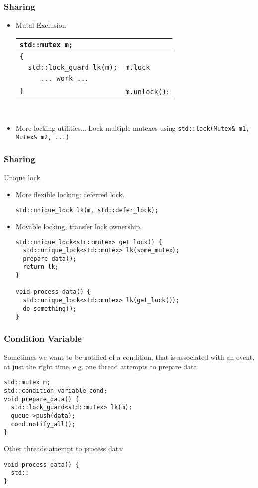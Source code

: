 \documentclass{beamer}
\begin{document}
\begin{frame}[fragile]
  \frametitle{Sharing}
  \begin{itemize}
  \item Mutal Exclusion
    \pause
    \begin{tabular}{l|l}
      \verb|std::mutex m;|&\\
      \hline
      \verb|{|&\\
      \hline
      \verb|  std::lock_guard lk(m);|&\verb|m.lock|\\
      \hline
      \verb|     ... work ...|&\\
      \hline
      \verb|}|&\verb|m.unlock()|:
    \end{tabular}\\
  \pause
  \item More locking utilities...
    Lock multiple mutexes using \verb|std::lock(Mutex& m1, Mutex& m2, ...)|
  \end{itemize}
\end{frame}

\begin{frame}[fragile]
\frametitle{Sharing}
Unique lock
\pause
\begin{itemize}
\item More flexible locking: deferred lock.
\begin{verbatim}
std::unique_lock lk(m, std::defer_lock);
\end{verbatim}
\pause
\item Movable locking, transfer lock ownership.
\begin{verbatim}
std::unique_lock<std::mutex> get_lock() {
  std::unique_lock<std::mutex> lk(some_mutex);
  prepare_data();
  return lk;
}

void process_data() {
  std::unique_lock<std::mutex> lk(get_lock());
  do_something();
}
\end{verbatim}
\end{itemize}
\end{frame}

\begin{frame}[fragile]
\frametitle{Condition Variable}
Sometimes we want to be notified of a condition, that is associated with an event, at just the right time, e.g. one thread attempts to prepare data:
\begin{verbatim}
std::mutex m;
std::condition_variable cond;
void prepare_data() {
  std::lock_guard<std::mutex> lk(m);
  queue->push(data);
  cond.notify_all();
}
\end{verbatim}
Other threads attempt to process data:
\begin{verbatim}
void process_data() {
  std::
}
\end{verbatim}
\end{frame}
\end{document}
